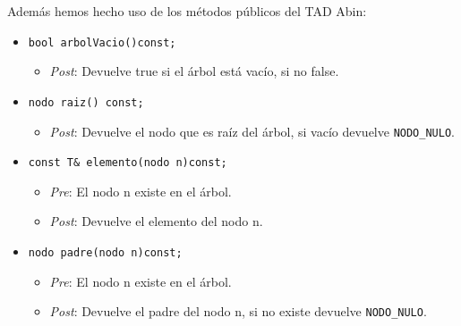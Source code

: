 Además hemos hecho uso de los métodos públicos del TAD Abin:
\begin{itemize}
  \item \verb|bool arbolVacio()const;|
  \begin{itemize}
    \item \textit{Post}: Devuelve true si el árbol está vacío, si no false.
  \end{itemize}
  \item \verb|nodo raiz() const;|
  \begin{itemize}
    \item \textit{Post}: Devuelve el nodo que es raíz del árbol, si vacío devuelve \texttt{NODO\_NULO}.
  \end{itemize}
  \item \verb|const T& elemento(nodo n)const;|
  \begin{itemize}
    \item \textit{Pre}: El nodo n existe en el árbol.
    \item \textit{Post}: Devuelve el elemento del nodo n.
  \end{itemize}
  \item \verb|nodo padre(nodo n)const;|
  \begin{itemize}
    \item \textit{Pre}: El nodo n existe en el árbol.
    \item \textit{Post}: Devuelve el padre del nodo n, si no existe devuelve \texttt{NODO\_NULO}.
  \end{itemize}
\end{itemize}